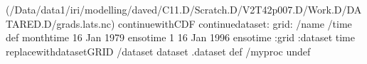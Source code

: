 \begin{ingrid}
(/Data/data1/iri/modelling/daved/C11.D/Scratch.D/V2T42p007.D/Work.D/DATARED.D/grads.lats.nc) continuewithCDF
continuedataset: 
grid:
/name /time def
monthtime
16 Jan 1979 ensotime
1
16 Jan 1996 ensotime
:grid
:dataset
time replacewithdatasetGRID
/dataset dataset .dataset def
/myproc undef
\end{ingrid}
